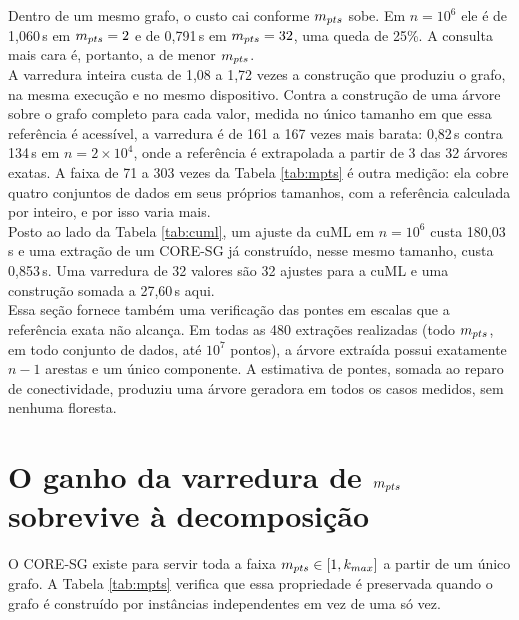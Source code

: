 Dentro de um mesmo grafo, o custo cai conforme $m_{pts}$ sobe. Em $n = 10^6$ ele é de 1,060\,s em $m_{pts} = 2$ e de 0,791\,s em $m_{pts} = 32$, uma queda de 25\%. A consulta mais cara é, portanto, a de menor $m_{pts}$.\\

A varredura inteira custa de 1,08 a 1,72 vezes a construção que produziu o grafo, na mesma execução e no mesmo dispositivo. Contra a construção de uma árvore sobre o grafo completo para cada valor, medida no único tamanho em que essa referência é acessível, a varredura é de 161 a 167 vezes mais barata: 0,82\,s contra 134\,s em $n = 2 \times 10^4$, onde a referência é extrapolada a partir de 3 das 32 árvores exatas. A faixa de 71 a 303 vezes da Tabela \ref{tab:mpts} é outra medição: ela cobre quatro conjuntos de dados em seus próprios tamanhos, com a referência calculada por inteiro, e por isso varia mais.\\

Posto ao lado da Tabela \ref{tab:cuml}, um ajuste da cuML em $n = 10^6$ custa 180,03\,s e uma extração de um \ac{CORE-SG} já construído, nesse mesmo tamanho, custa 0,853\,s. Uma varredura de 32 valores são 32 ajustes para a cuML e uma construção somada a 27,60\,s aqui.\\

Essa seção fornece também uma verificação das pontes em escalas que a referência exata não alcança. Em todas as 480 extrações realizadas (todo $m_{pts}$, em todo conjunto de dados, até $10^7$ pontos), a árvore extraída possui exatamente $n - 1$ arestas e um único componente. A estimativa de pontes, somada ao reparo de conectividade, produziu uma árvore geradora em todos os casos medidos, sem nenhuma floresta.\\

\section{O ganho da varredura de $m_{pts}$ sobrevive à decomposição\label{sec:res-mpts}}

O \ac{CORE-SG} existe para servir toda a faixa $m_{pts} \in [1, k_{max}]$ a partir de um único grafo. A Tabela \ref{tab:mpts} verifica que essa propriedade é preservada quando o grafo é construído por instâncias independentes em vez de uma só vez.\\

